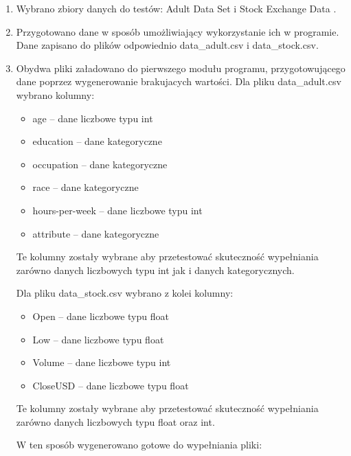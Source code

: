 \documentclass[12pt,twoside]{article}
\begin{document}
\begin{enumerate}[label=\arabic*), leftmargin=1.25cm]
    \item Wybrano zbiory danych do testów: Adult Data Set \cite{adult} i Stock Exchange Data \cite{stock}.
    \item Przygotowano dane w sposób umożliwiający wykorzystanie ich w programie.
          Dane zapisano do plików odpowiednio data\_adult.csv i data\_stock.csv.
    \item Obydwa pliki załadowano do pierwszego modułu programu, przygotowującego dane poprzez wygenerowanie
          brakujacych wartości. Dla pliku data\_adult.csv wybrano kolumny:

          \begin{itemize}[label=-,labelsep=0.4cm, leftmargin=1.25cm]
              \item age -- dane liczbowe typu int
              \item education -- dane kategoryczne
              \item occupation -- dane kategoryczne
              \item race -- dane kategoryczne
              \item hours-per-week -- dane liczbowe typu int
              \item attribute -- dane kategoryczne
          \end{itemize}

          Te kolumny zostały wybrane aby przetestować skuteczność wypełniania
          zarówno danych liczbowych typu int jak i danych kategorycznych.

          Dla pliku data\_stock.csv wybrano z kolei kolumny:

          \begin{itemize}[label=-,labelsep=0.4cm, leftmargin=1.25cm]
              \item Open -- dane liczbowe typu float
              \item Low -- dane liczbowe typu float
              \item Volume -- dane liczbowe typu int
              \item CloseUSD -- dane liczbowe typu float
          \end{itemize}

          Te kolumny zostały wybrane aby przetestować skuteczność wypełniania
          zarówno danych liczbowych typu float oraz int.

          W ten sposób wygenerowano gotowe do wypełniania pliki:


\end{enumerate}
\end{document}

